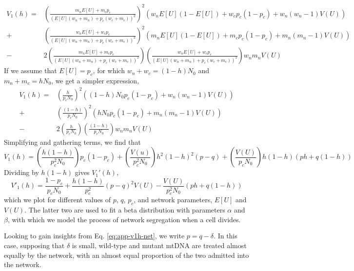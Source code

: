 \documentclass{article}
\begin{document}
\begin{appendices}
\begin{equation}
    \begin{split}
    V_1(h)= &\left(\frac{m_nE[U]+m_cp_c}{(E[U](w_n+m_n)+p_c(w_c+m_c))^2}\right)^2
       \left(w_nE[U](1-E[U])+w_cp_c(1-p_c)+w_n(w_n-1)V(U)\right)\\
      +&\left(\frac{w_nE[U]+w_cp_c}{(E[U](w_n+m_n)+p_c(w_c+m_c))^2}\right)^2
       (m_nE[U](1-E[U])+m_cp_c(1-p_c)+m_n(m_n-1)V(U))\\
      -&2\left(\frac{m_nE[U]+m_cp_c}{(E[U](w_n+m_n)+p_c(w_c+m_c))^2}\right)\left(\frac{w_nE[U]+w_cp_c}{(E[U](w_n+m_n)+p_c(w_c+m_c))^2}\right)w_nm_nV(U)
    \end{split}
\end{equation}
If we assume that $E[U]=p_c$, for which $w_n+w_c=(1-h)N_0$ and $m_n+m_c=hN_0$, we get a simpler expression,
\begin{equation}
    \begin{split}
    V_1(h)= &\left(\frac{h}{p_cN_0}\right)^2
       \left((1-h)N_0p_c(1-p_c)+w_n(w_n-1)V(U)\right)\\
      +&\left(\frac{(1-h)}{p_cN_0}\right)^2
       (hN_0p_c(1-p_c)+m_n(m_n-1)V(U))\\
      -&2\left(\frac{h}{p_cN_0}\right)\left(\frac{(1-h)}{p_cN_0}\right)w_nm_nV(U)
    \end{split}
\end{equation}
Simplifying and gathering terms, we find that
\begin{equation}
    V_1(h)= \left(\frac{h(1-h)}{p_c^2N_0}\right)p_c(1-p_c)+\left(\frac{V(u)}{p_c^2N_0}\right)h^2(1-h)^2(p-q)+\left(\frac{V(U)}{p_cN_0}\right)h(1-h)(ph+q(1-h))
\end{equation}
Dividing by $h(1-h)$ gives $V_1'(h)$,
\begin{equation}\label{eq:app-v1h-net}
V'_1(h) = \frac{1-p_c}{p_cN_0}
        +\frac{h(1-h)}{p_c^2}(p-q)^2V(U)
        -\frac{V(U)}{p_c^2N_0}(ph+q(1-h))
\end{equation}
which we plot for different values of $p$, $q$, $p_c$, and network parameters, $E[U]$ and $V(U)$. The latter two are used to fit a beta distribution with parameters $\alpha$ and $\beta$, with which we model the process of network segregation when a cell divides.%

Looking to gain insights from Eq. \ref{eq:app-v1h-net}, we write $p = q-\delta$. In this case, supposing that $\delta$ is small, wild-type and mutant mtDNA are treated almost equally by the network, with an almost equal proportion of the two admitted into the network.


\end{appendices}
\end{document}
